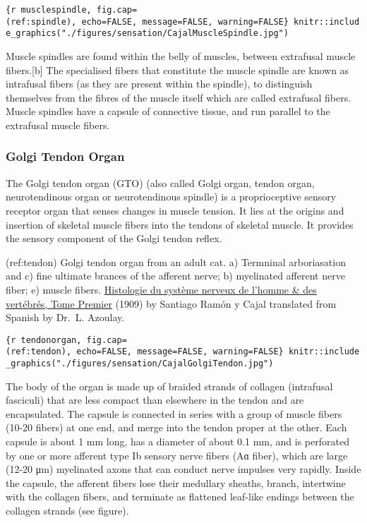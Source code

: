 \texttt{\{r\ musclespindle,\ fig.cap=\textquotesingle{}(ref:spindle)\textquotesingle{},\ echo=FALSE,\ message=FALSE,\ warning=FALSE\}\ knitr::include\_graphics("./figures/sensation/CajalMuscleSpindle.jpg")}

Muscle spindles are found within the belly of muscles, between
extrafusal muscle fibers.{[}b{]} The specialised fibers that constitute
the muscle spindle are known as intrafusal fibers (as they are present
within the spindle), to distinguish themselves from the fibres of the
muscle itself which are called extrafusal fibers. Muscle spindles have a
capsule of connective tissue, and run parallel to the extrafusal muscle
fibers.

\hypertarget{golgi-tendon-organ}{%
\subsubsection{Golgi Tendon Organ}\label{golgi-tendon-organ}}

The Golgi tendon organ (GTO) (also called Golgi organ, tendon organ,
neurotendinous organ or neurotendinous spindle) is a proprioceptive
sensory receptor organ that senses changes in muscle tension. It lies at
the origins and insertion of skeletal muscle fibers into the tendons of
skeletal muscle. It provides the sensory component of the Golgi tendon
reflex.

(ref:tendon) Golgi tendon organ from an adult cat. a) Termninal
arboriasation and c) fine ultimate brances of the afferent nerve; b)
myelinated afferent nerve fiber; e) muscle fibers.
\href{https://wellcomelibrary.org/item/b2129592x\#?c=0\&m=0\&s=0\&cv=14\&z=0\%2C-3.48\%2C1\%2C8.6591}{Histologie
du système nerveux de l'homme \& des vertébrés, Tome Premier} (1909) by
Santiago Ramón y Cajal translated from Spanish by Dr.~L. Azoulay.

\texttt{\{r\ tendonorgan,\ fig.cap=\textquotesingle{}(ref:tendon)\textquotesingle{},\ echo=FALSE,\ message=FALSE,\ warning=FALSE\}\ knitr::include\_graphics("./figures/sensation/CajalGolgiTendon.jpg")}

The body of the organ is made up of braided strands of collagen
(intrafusal fasciculi) that are less compact than elsewhere in the
tendon and are encapsulated. The capsule is connected in series with a
group of muscle fibers (10-20 fibers) at one end, and merge into the
tendon proper at the other. Each capsule is about 1 mm long, has a
diameter of about 0.1 mm, and is perforated by one or more afferent type
Ib sensory nerve fibers (Aɑ fiber), which are large (12-20 μm)
myelinated axons that can conduct nerve impulses very rapidly. Inside
the capsule, the afferent fibers lose their medullary sheaths, branch,
intertwine with the collagen fibers, and terminate as flattened
leaf-like endings between the collagen strands (see figure).

